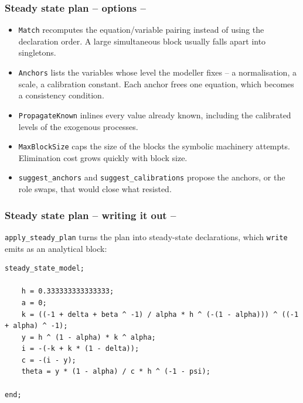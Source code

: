 \documentclass[10pt,slidestop]{beamer}
\theoremstyle{plain}
\begin{document}
\begin{frame}[c,fragile]
  \frametitle{Steady state plan -- options --}

  \begin{itemize}

  \item \verb+Match+ recomputes the equation/variable pairing instead of using
    the declaration order. A large simultaneous block usually falls apart into
    singletons.\newline

  \item \verb+Anchors+ lists the variables whose level the modeller fixes -- a
    normalisation, a scale, a calibration constant. Each anchor frees one
    equation, which becomes a consistency condition.\newline

  \item \verb+PropagateKnown+ inlines every value already known, including the
    calibrated levels of the exogenous processes.\newline

  \item \verb+MaxBlockSize+ caps the size of the blocks the symbolic machinery
    attempts. Elimination cost grows quickly with block size.\newline

  \item \verb+suggest_anchors+ and \verb+suggest_calibrations+ propose the
    anchors, or the role swaps, that would close what resisted.

  \end{itemize}

\end{frame}


\begin{frame}[c,fragile]
  \frametitle{Steady state plan -- writing it out --}

  \verb+apply_steady_plan+ turns the plan into steady-state declarations, which
  \verb+write+ emits as an analytical block:

  \bigskip

  \begin{lstlisting}[language=Dynare,basicstyle=\footnotesize\ttfamily,numbers=none]
steady_state_model;

	h = 0.333333333333333;
	a = 0;
	k = ((-1 + delta + beta ^ -1) / alpha * h ^ (-(1 - alpha))) ^ ((-1 + alpha) ^ -1);
	y = h ^ (1 - alpha) * k ^ alpha;
	i = -(-k + k * (1 - delta));
	c = -(i - y);
	theta = y * (1 - alpha) / c * h ^ (-1 - psi);

end;
  \end{lstlisting}

\end{frame}
\end{document}

